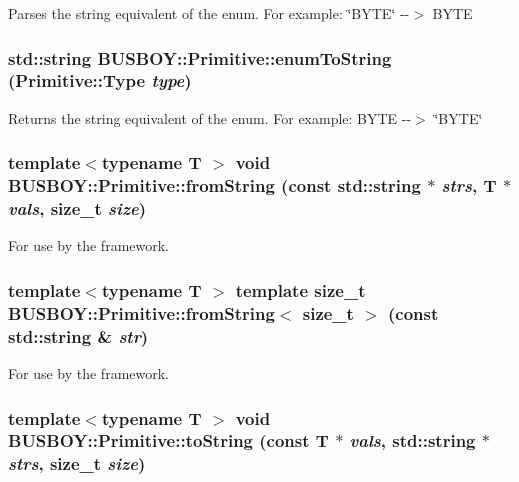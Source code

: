 Parses the string equivalent of the enum. For example: \char`\"{}BYTE\char`\"{} -\/-\/$>$ BYTE \hypertarget{classBUSBOY_1_1Primitive_ababc327b08e5eb9305fe48e6735b4780}{
\subsubsection[{enumToString}]{\setlength{\rightskip}{0pt plus 5cm}std::string BUSBOY::Primitive::enumToString ({\bf Primitive::Type} {\em type})}}
\label{classBUSBOY_1_1Primitive_ababc327b08e5eb9305fe48e6735b4780}


Returns the string equivalent of the enum. For example: BYTE -\/-\/$>$ \char`\"{}BYTE\char`\"{} \hypertarget{classBUSBOY_1_1Primitive_a5d35a19bc1fb5a9c1cb319b01622a5e0}{
\subsubsection[{fromString}]{\setlength{\rightskip}{0pt plus 5cm}template$<$typename T $>$ void BUSBOY::Primitive::fromString (const std::string $\ast$ {\em strs}, \/  T $\ast$ {\em vals}, \/  size\_\-t {\em size})}}
\label{classBUSBOY_1_1Primitive_a5d35a19bc1fb5a9c1cb319b01622a5e0}


For use by the framework. \hypertarget{classBUSBOY_1_1Primitive_aaed30daa2799a2e918343211915a77f5}{
\subsubsection[{fromString}]{\setlength{\rightskip}{0pt plus 5cm}template$<$typename T $>$ template size\_\-t BUSBOY::Primitive::fromString$<$ size\_\-t $>$ (const std::string \& {\em str})}}
\label{classBUSBOY_1_1Primitive_aaed30daa2799a2e918343211915a77f5}


For use by the framework. \hypertarget{classBUSBOY_1_1Primitive_aafde6fe3de51895d6b82b527cb2202e5}{
\subsubsection[{toString}]{\setlength{\rightskip}{0pt plus 5cm}template$<$typename T $>$ void BUSBOY::Primitive::toString (const T $\ast$ {\em vals}, \/  std::string $\ast$ {\em strs}, \/  size\_\-t {\em size})}}
\label{classBUSBOY_1_1Primitive_aafde6fe3de51895d6b82b527cb2202e5}


